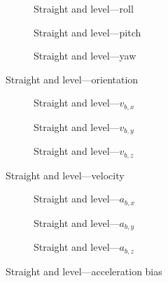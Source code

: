 \begin{figure}[!ht]
    \centering
    \begin{subfigure}{0.3\textwidth}
        
        \caption{Straight and level---roll}
    \end{subfigure}
    \hfill
    \begin{subfigure}{0.3\textwidth}
        
        \caption{Straight and level---pitch}
    \end{subfigure}
    \hfill
    \begin{subfigure}{0.3\textwidth}
        
        \caption{Straight and level---yaw}
    \end{subfigure}
    \caption{Straight and level---orientation}\label{fig:straight-level-ori}
\end{figure}

\begin{figure}[!ht]
    \centering
    \begin{subfigure}{0.3\textwidth}
        
        \caption{Straight and level---$v_{b,x}$}
    \end{subfigure}
    \hfill
    \begin{subfigure}{0.3\textwidth}
        
        \caption{Straight and level---$v_{b,y}$}
    \end{subfigure}
    \hfill
    \begin{subfigure}{0.3\textwidth}
        
        \caption{Straight and level---$v_{b,z}$}
    \end{subfigure}
    \caption{Straight and level---velocity}\label{fig:straight-level-vel}
\end{figure}

\begin{figure}[!ht]
    \centering
    \begin{subfigure}{0.3\textwidth}
        
        \caption{Straight and level---$a_{b,x}$}
    \end{subfigure}
    \hfill
    \begin{subfigure}{0.3\textwidth}
        
        \caption{Straight and level---$a_{b,y}$}
    \end{subfigure}
    \hfill
    \begin{subfigure}{0.3\textwidth}
        
        \caption{Straight and level---$a_{b,z}$}
    \end{subfigure}
    \caption{Straight and level---acceleration bias}\label{fig:straight-level-abias}
\end{figure}

